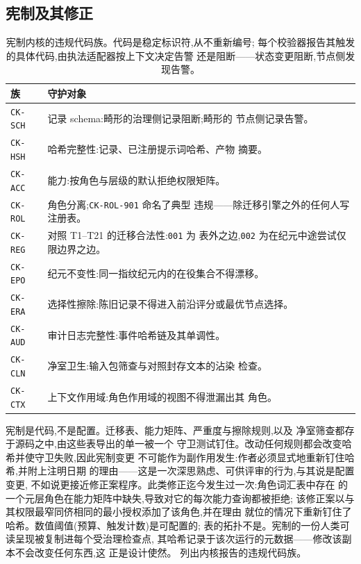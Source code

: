 \subsection{宪制及其修正}\label{sec:rqgm:constitution}

\begin{table}[t]
  \centering
  \small
  \begin{tabularx}{\columnwidth}{@{}lX@{}}
    \toprule
    \textbf{族} & \textbf{守护对象} \\
    \midrule
    \texttt{CK-SCH} & 记录 schema:畸形的治理侧记录阻断;畸形的
      节点侧记录告警。 \\
    \texttt{CK-HSH} & 哈希完整性:记录、已注册提示词哈希、产物
      摘要。 \\
    \texttt{CK-ACC} & 能力:按角色与层级的默认拒绝权限矩阵。 \\
    \texttt{CK-ROL} & 角色分离;\texttt{CK-ROL-901} 命名了典型
      违规——除迁移引擎之外的任何人写注册表。 \\
    \texttt{CK-REG} & 对照 T1--T21 的迁移合法性:\texttt{001} 为
      表外之边,\texttt{002} 为在纪元中途尝试仅限边界之边。 \\
    \texttt{CK-EPO} & 纪元不变性:同一指纹纪元内的在役集合不得漂移。 \\
    \texttt{CK-ERA} & 选择性擦除:陈旧记录不得进入前沿评分或最优节点选择。 \\
    \texttt{CK-AUD} & 审计日志完整性:事件哈希链及其单调性。 \\
    \texttt{CK-CLN} & 净室卫生:输入包筛查与对照封存文本的沾染
      检查。 \\
    \texttt{CK-CTX} & 上下文作用域:角色作用域的视图不得泄漏出其
      角色。 \\
    \bottomrule
  \end{tabularx}
  \caption{宪制内核的违规代码族。代码是稳定标识符,从不重新编号;
    每个校验器报告其触发的具体代码,由执法适配器按上下文决定告警
    还是阻断——状态变更阻断,节点侧发现告警。}
  \label{tab:ck-codes}
\end{table}

宪制是代码,不是配置。迁移表、能力矩阵、严重度与擦除规则,以及
净室筛查都存于源码之中,由这些表导出的单一被一个
守卫测试钉住。改动任何规则都会改变哈希并使守卫失败,因此宪制变更
不可能作为副作用发生:作者必须显式地重新钉住哈希,并附上注明日期
的理由——这是一次深思熟虑、可供评审的行为,与其说是配置变更,
不如说更接近修正案程序。此类修正迄今发生过一次:角色词汇表中存在
的一个元层角色在能力矩阵中缺失,导致对它的每次能力查询都被拒绝;
该修正案以与其权限最窄同侪相同的最小授权添加了该角色,并在理由
就位的情况下重新钉住了哈希。数值阈值(预算、触发计数)是可配置的;
表的拓扑不是。宪制的一份人类可读呈现被复制进每个受治理检查点,
其哈希记录于该次运行的元数据——修改该副本不会改变任何东西,这
正是设计使然。 列出内核报告的违规代码族。


